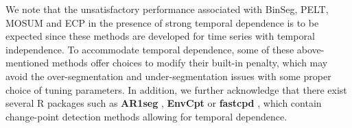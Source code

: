 {We note that the unsatisfactory performance associated with  BinSeg, PELT, MOSUM and ECP  in the presence of strong temporal dependence is to be expected since these methods are developed for time series  with temporal independence. To accommodate temporal dependence, some of these above-mentioned methods offer choices to modify their built-in penalty, which may avoid the over-segmentation and under-segmentation issues with some proper choice of tuning parameters. In addition, we further acknowledge that there exist several R packages such as \textbf{AR1seg} \citep{levy2014package}, \textbf{EnvCpt} \citep{killick2021package} or \textbf{fastcpd} \citep{li2024fastcpd}, which contain change-point detection methods allowing for temporal dependence.} 


